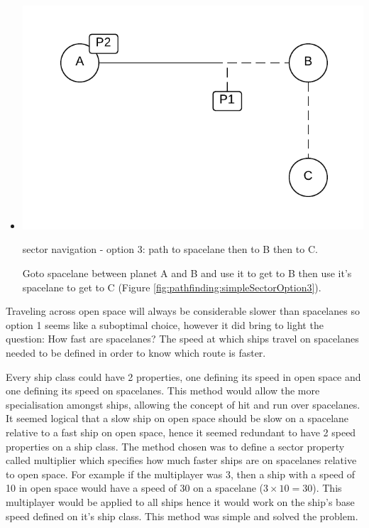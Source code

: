 \begin{itemize}
\item 
\begin{marginfigure}
	\includegraphics{res/pathfinding/PathFindingSectorOption3.pdf}
    \caption[sector navigation - option 3: path to spacelane then to B then to C]{sector navigation - option 3: path to spacelane then to B then to C.}
	\label{fig:pathfinding:simpleSectorOption3}
\end{marginfigure}
Goto spacelane between planet A and B and use it to get to B then use it's spacelane to get to C (Figure \ref{fig:pathfinding:simpleSectorOption3}).

\end{itemize}

Traveling across open space will always be considerable slower than spacelanes so option 1 seems like a suboptimal choice, however it did bring to light the question: How fast are spacelanes?
The speed at which ships travel on spacelanes needed to be defined in order to know which route is faster.

Every ship class could have 2 properties, one defining its speed in open space and one defining its speed on spacelanes.
This method would allow the more specialisation amongst ships, allowing the concept of hit and run over spacelanes. 
It seemed logical that a slow ship on open space should be slow on a spacelane relative to a fast ship on open space, hence it seemed redundant to have 2 speed properties on a ship class.
The method chosen was to define a sector property called multiplier which specifies how much faster ships are on spacelanes relative to open space.
For example if the multiplayer was 3, then a ship with a speed of 10 in open space would have a speed of 30 on a spacelane ($ 3 \times 10 = 30 $).
This multiplayer would be applied to all ships hence it would work on the ship's base speed defined on it's ship class.
This method was simple and solved the problem.

